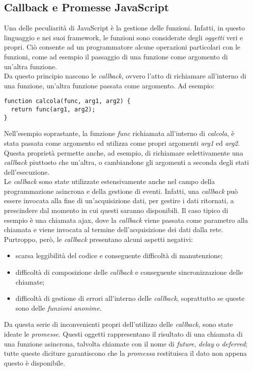\subsection{Callback e Promesse JavaScript}
Una delle peculiarità di JavaScript è la gestione delle funzioni. Infatti, in questo linguaggio e nei suoi framework, le funzioni sono considerate degli \emph{oggetti} veri e propri. Ciò consente ad un programmatore alcune operazioni particolari con le funzioni, come ad esempio il passaggio di una funzione come argomento di un'altra funzione.\\
Da questo principio nascono le \emph{callback}, ovvero l'atto di richiamare all'interno di una funzione, un'altra funzione passata come argomento. Ad esempio:
\begin{verbatim}
function calcola(func, arg1, arg2) {
  return func(arg1, arg2);
}
\end{verbatim}
Nell'esempio soprastante, la funzione \emph{func} richiamata all'interno di \emph{calcola}, è stata passata come argomento ed utilizza come propri argomenti \emph{arg1} ed \emph{arg2}. Questa proprietà permette anche, ad esempio, di richiamare selettivamente una \emph{callback} piuttosto che un'altra, o cambiandone gli argomenti a seconda degli stati dell'esecuzione.\\
Le \emph{callback} sono state utilizzate estensivamente anche nel campo della programmazione asincrona e della gestione di eventi. Infatti, una \emph{callback} può essere invocata alla fine di un'acquisizione dati, per gestire i dati ritornati, a prescindere dal momento in cui questi saranno disponibili. Il caso tipico di esempio è una chiamata \gls{ajax}, dove la \emph{callback} viene passata come parametro alla chiamata e viene invocata al termine dell'acquisizione dei dati dalla rete.\\
Purtroppo, però, le \emph{callback} presentano alcuni aspetti negativi:
\begin{itemize}
	\item scarsa leggibilità del codice e conseguente difficoltà di manutenzione;
	\item difficoltà di composizione delle \emph{callback} e conseguente sincronizzazione delle chiamate;
	\item difficoltà di gestione di errori all'interno delle \emph{callback}, soprattutto se queste sono delle \emph{funzioni anonime}.
\end{itemize}
Da questa serie di inconvenienti propri dell'utilizzo delle \emph{callback}, sono state ideate le \emph{promesse}. Questi oggetti rappresentano il risultato di una chiamata di una funzione asincrona, talvolta chiamate con il nome di \emph{future}, \emph{delay} o \emph{deferred}; tutte queste diciture garantiscono che la \emph{promessa} restituisca il dato non appena questo è disponibile.\\
